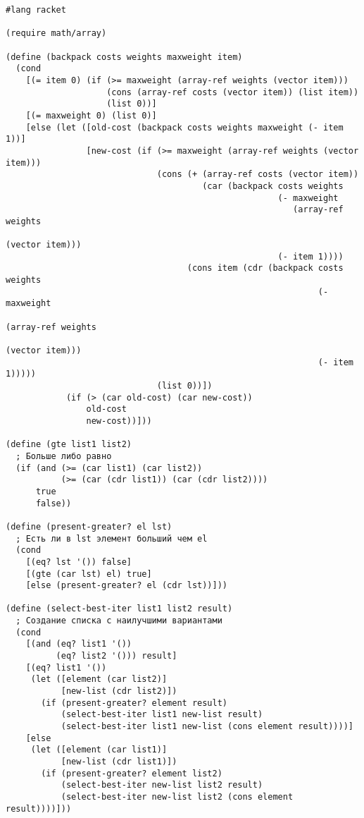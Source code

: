 
\begin{lstlisting}[style=customlisp, caption=cw.rkt]
#lang racket

(require math/array)

(define (backpack costs weights maxweight item)
  (cond
    [(= item 0) (if (>= maxweight (array-ref weights (vector item)))
                    (cons (array-ref costs (vector item)) (list item))
                    (list 0))]
    [(= maxweight 0) (list 0)]
    [else (let ([old-cost (backpack costs weights maxweight (- item 1))]
                [new-cost (if (>= maxweight (array-ref weights (vector item)))
                              (cons (+ (array-ref costs (vector item))
                                       (car (backpack costs weights 
                                                      (- maxweight 
                                                         (array-ref weights 
                                                                    (vector item))) 
                                                      (- item 1))))
                                    (cons item (cdr (backpack costs weights 
                                                              (- maxweight 
                                                                 (array-ref weights 
                                                                            (vector item))) 
                                                              (- item 1)))))
                              (list 0))])
            (if (> (car old-cost) (car new-cost))
                old-cost
                new-cost))]))

(define (gte list1 list2)
  ; Больше либо равно
  (if (and (>= (car list1) (car list2))
           (>= (car (cdr list1)) (car (cdr list2))))
      true
      false))

(define (present-greater? el lst)
  ; Есть ли в lst элемент больший чем el
  (cond
    [(eq? lst '()) false]
    [(gte (car lst) el) true]
    [else (present-greater? el (cdr lst))]))

(define (select-best-iter list1 list2 result)
  ; Создание списка с наилучшими вариантами
  (cond
    [(and (eq? list1 '())
          (eq? list2 '())) result]
    [(eq? list1 '())
     (let ([element (car list2)]
           [new-list (cdr list2)]) 
       (if (present-greater? element result)
           (select-best-iter list1 new-list result)
           (select-best-iter list1 new-list (cons element result))))]
    [else
     (let ([element (car list1)]
           [new-list (cdr list1)])
       (if (present-greater? element list2)
           (select-best-iter new-list list2 result)
           (select-best-iter new-list list2 (cons element result))))]))


\end{lstlisting}
